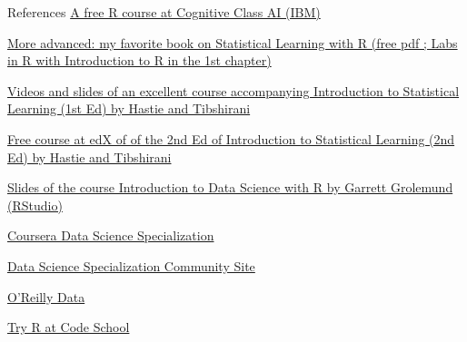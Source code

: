 \documentclass[
  ignorenonframetext,
]{beamer}
\begin{document}
\begin{frame}{References}
\protect\hypertarget{references}{}
\href{https://cognitiveclass.ai/courses/r-101}{A free R course at
Cognitive Class AI (IBM)}

\href{https://www.statlearning.com/}{More advanced: my favorite book on
Statistical Learning with R (free pdf ; Labs in R with Introduction to R
in the 1st chapter)}

\href{https://www.dataschool.io/15-hours-of-expert-machine-learning-videos/}{Videos
and slides of an excellent course accompanying Introduction to
Statistical Learning (1st Ed) by Hastie and Tibshirani}

\href{https://www.edx.org/course/statistical-learning}{Free course at
edX of of the 2nd Ed of Introduction to Statistical Learning (2nd Ed) by
Hastie and Tibshirani}

\href{https://github.com/rstudio/Intro/tree/master/slides}{Slides of the
course Introduction to Data Science with R by Garrett Grolemund
(RStudio)}

\href{https://www.coursera.org/specialization/jhudatascience/1?utm_medium=listingPage}{Coursera
Data Science Specialization}

\href{http://datasciencespecialization.github.io/}{Data Science
Specialization Community Site}

\href{http://www.oreilly.com/data/}{O'Reilly Data}

\href{http://tryr.codeschool.com/}{Try R at Code School}
\end{frame}
\end{document}

